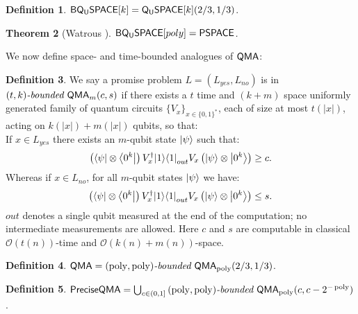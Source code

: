\documentclass[11pt]{article}
\newtheorem{theorem}{Theorem}
\theoremstyle{definition}
\newtheorem{definition}[theorem]{Definition}
\theoremstyle{remark}
\newcommand\QMA{{\sf{QMA}}}
\newcommand\QSPACE{{\sf{Q_{U}SPACE}}}
\newcommand\PQSPACE{{\sf{PQ_{U}SPACE}}}
\newcommand\BQSPACE{{\sf{BQ_{U}SPACE}}}
\newcommand\PSPACE{{\sf{PSPACE}}}
\newcommand\QMAexp{{\sf{PreciseQMA}}}
\newcommand\bddQMA[5]{{\left(#1,#2\right)}\textit{-bounded }\QMA_{#3}(#4,#5)}
\newcommand\bigoh{\mathcal{O}}
\DeclareMathOperator{\poly}{poly}
\begin{document}
\begin{definition} $\BQSPACE[k]=\QSPACE[k](2/3,1/3)$.\end{definition}
\begin{theorem}[Watrous \cite{Watrous99}]\label{thm:pqpspace} $\BQSPACE[poly]=\PSPACE$.
\end{theorem}

We now define space- and time-bounded analogues of $\QMA$:
\begin{definition}We say a promise problem $L=(L_{yes},L_{no})$ is in $\bddQMA{t}{k}{m}{c}{s}$ if there exists a $t$ time and $(k+m)$ space uniformly generated family of quantum circuits $\{ V_x\}_{x\in\{0,1\}^*}$, each of size at most $t(|x|)$, acting on $k(|x|)+m(|x|)$ qubits, so that:\\

If $x \in L_{yes}$ there exists an $m$-qubit state ${\left\vert{\psi}\right\rangle}$ such that:
\begin{equation}
\left({\left\langle{\psi}\right\vert}\otimes {\left\langle{0^k}\right\vert}\right) V^\dagger_x {\left\vert{1}\right\rangle}{\left\langle{1}\right\vert}_{out} V_x \left({\left\vert{\psi}\right\rangle}\otimes {\left\vert{0^k}\right\rangle}\right) \ge c.
\end{equation}
Whereas if $x \in L_{no}$, for all $m$-qubit states ${\left\vert{\psi}\right\rangle}$ we have:
\begin{equation}
\left({\left\langle{\psi}\right\vert}\otimes {\left\langle{0^k}\right\vert}\right) V^\dagger_x {\left\vert{1}\right\rangle}{\left\langle{1}\right\vert}_{out} V_x \left({\left\vert{\psi}\right\rangle}\otimes {\left\vert{0^k}\right\rangle}\right) \le s.
\end{equation}
$out$ denotes a single qubit measured at the end of the computation; no intermediate measurements are allowed.  
Here $c$ and $s$ are computable in classical $\bigoh(t(n))$-time and $\bigoh(k(n)+m(n))$-space.
  \end{definition}

\begin{definition} $\QMA=\bddQMA{\poly}{\poly}{\poly}{2/3}{1/3}$.
\end{definition}
\begin{definition} $\QMAexp=\bigcup_{c \in (0,1]}\bddQMA{\poly}{\poly}{\poly}{c}{c-2^{-\poly}}$.
\end{definition}
\end{document}
